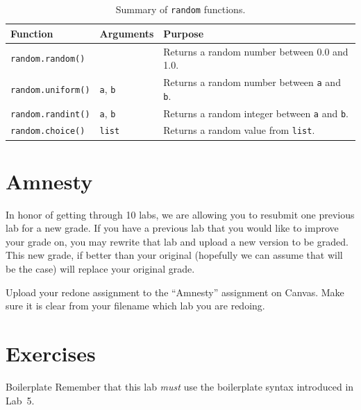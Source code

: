 \documentclass[11pt]{cselabheader}
\begin{document}
\begin{table}[!ht]
  \centering
  \begin{tabular}{p{3.0cm} p{2cm} p{10cm}}
    \toprule
    \bfseries Function & \bfseries Arguments & \bfseries Purpose \\
    \midrule
    \lstinline{random.random()} & & Returns a random number between 0.0 and 1.0.\\
    \lstinline{random.uniform()} & \lstinline{a}, \lstinline{b} & Returns a random number between \lstinline{a} and \lstinline{b}.\\
    \lstinline{random.randint()} & \lstinline{a}, \lstinline{b} & Returns a random integer between \lstinline{a} and \lstinline{b}.\\
    \lstinline{random.choice()} & \lstinline{list} & Returns a random value from \lstinline{list}.\\
    \bottomrule
  \end{tabular}
  \caption{Summary of \lstinline{random} functions.}
  \label{tab:rand}
\end{table}


\section{Amnesty}
\label{sec:amnesty}
In honor of getting through 10 labs, we are allowing you to resubmit one previous lab for a new grade. If you have a previous lab that you would like to improve your grade on, you may rewrite that lab and upload a new version to be graded. This new grade, if better than your original (hopefully we can assume that will be the case) will replace your original grade.

Upload your redone assignment to the ``Amnesty'' assignment on Canvas.
Make sure it is clear from your filename which lab you are redoing.

\pagebreak


\clearpage
\section{Exercises}
\label{sec:ex}

\begin{warningbox}{Boilerplate}
  Remember that this lab \emph{must} use the
  boilerplate syntax introduced in Lab~5.
\end{warningbox}
\end{document}
